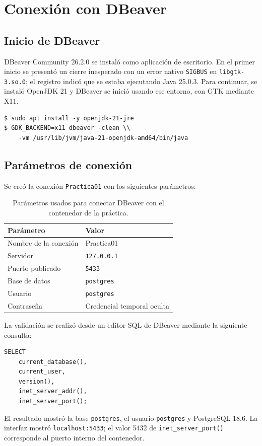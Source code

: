 \section{Conexión con DBeaver}

\subsection{Inicio de DBeaver}

DBeaver Community 26.2.0 se instaló como aplicación de escritorio. En el
primer inicio se presentó un cierre inesperado con un error nativo
\texttt{SIGBUS} en \texttt{libgtk-3.so.0}; el registro indicó que se estaba
ejecutando Java 25.0.3. Para continuar, se instaló OpenJDK 21 y DBeaver se
inició usando ese entorno, con GTK mediante X11.

\begin{lstlisting}[style=terminal]
$ sudo apt install -y openjdk-21-jre
$ GDK_BACKEND=x11 dbeaver -clean \\
    -vm /usr/lib/jvm/java-21-openjdk-amd64/bin/java
\end{lstlisting}

\subsection{Parámetros de conexión}

Se creó la conexión \texttt{Practica01} con los siguientes parámetros:

\begin{table}[H]
  \centering
  \begin{tabular}{ll}
    \toprule
    \textbf{Parámetro} & \textbf{Valor} \\
    \midrule
    Nombre de la conexión & Practica01 \\
    Servidor & \texttt{127.0.0.1} \\
    Puerto publicado & \texttt{5433} \\
    Base de datos & \texttt{postgres} \\
    Usuario & \texttt{postgres} \\
    Contraseña & Credencial temporal oculta \\
    \bottomrule
  \end{tabular}
  \caption{Parámetros usados para conectar DBeaver con el contenedor de la práctica.}
\end{table}

La validación se realizó desde un editor SQL de DBeaver mediante la siguiente
consulta:

\begin{lstlisting}[style=terminal]
SELECT
    current_database(),
    current_user,
    version(),
    inet_server_addr(),
    inet_server_port();
\end{lstlisting}

El resultado mostró la base \texttt{postgres}, el usuario \texttt{postgres} y
PostgreSQL 18.6. La interfaz mostró \texttt{localhost:5433}; el valor 5432 de
\texttt{inet\_server\_port()} corresponde al puerto interno del contenedor.

